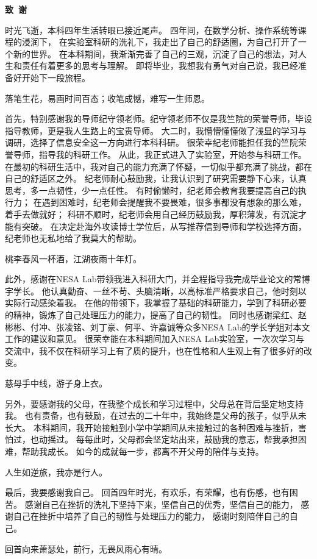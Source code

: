 \cleardoublepage{}
\begin{center}
    \bfseries {} 致~谢
\end{center}

时光飞逝，本科四年生活转眼已接近尾声。
四年间，在数学分析、操作系统等课程的浸润下，
在实验室科研的洗礼下，我走出了自己的舒适圈，为自己打开了一个新的世界。
在本科期间，我渐渐完善了自己的三观，沉淀了自己的想法，对人生和责任有着更多的思考与理解。
即将毕业，我想我有勇气对自己说，我已经准备好开始下一段旅程。

落笔生花，易画时间百态；收笔成憾，难写一生师恩。

首先，特别感谢我的导师纪守领老师。纪守领老师不仅是我竺院的荣誉导师，毕设指导教师，更是我人生路上的宝贵导师。
大二时，我懵懵懂懂做了浅显的学习与调研，选择了信息安全这一方向进行本科科研。
很荣幸纪老师能担任我的竺院荣誉导师，指导我的科研工作。
从此，我正式进入了实验室，开始参与科研工作。
在最初的科研生活中，我对自己的能力充满了怀疑，一切似乎都充满了挑战，都在自己的舒适区之外。
纪老师耐心鼓励我，让我认识到了研究需要静下心来，认真思考，多一点韧性，少一点任性。
有时偷懒时，纪老师会教育我要提高自己的执行力；
在遇到困难时，纪老师会提醒我不要畏难，很多事都没有想象的那么难，着手去做就好；
科研不顺时，纪老师会用自己经历鼓励我，厚积薄发，有沉淀才能有突破。
在决定赴海外攻读博士学位后，从写推荐信到导师和学校选择方面，纪老师也无私地给了我莫大的帮助。

桃李春风一杯酒，江湖夜雨十年灯。

此外，感谢在NESA Lab带领我进入科研大门，并全程指导我完成毕业论文的常博宇学长。
他认真勤奋、一丝不苟、头脑清晰，以高标准严格要求自己，他时刻以实际行动感染着我。
在他的带领下，我掌握了基础的科研能力，学到了科研必要的精神，锻炼了自己处理压力的能力，提高了自己的韧性。
同时也感谢梁红、赵彬彬、付冲、张凌铭、刘丁豪、何平、许嘉诚等众多NESA Lab的学长学姐对本文工作的建议和意见。
很荣幸能在本科期间加入NESA Lab实验室，一次次学习与交流中，我不仅在科研学习上有了质的提升，也在性格和人生观上有了很多好的改变。

慈母手中线，游子身上衣。

另外，要感谢我的父母，在我整个成长和学习过程中，父母总在背后坚定地支持我。
也有责备，也有鼓励，在过去的二十年中，我始终是父母的孩子，似乎从未长大。
本科期间，我开始接触到小学中学期间从未接触过的各种困难与挫折，害怕过，也动摇过。
每每此时，父母都会坚定站出来，鼓励我的意志，帮我承担困难，帮助我成长。
如今的成就每一步，都离不开父母的陪伴与支持。

人生如逆旅，我亦是行人。

最后，我要感谢我自己。
回首四年时光，有欢乐，有荣耀，也有伤感，也有困苦。
感谢自己在挫折的洗礼下坚持下来，坚信自己的优秀，坚信自己的能力，
感谢自己在挫折中培养了自己的韧性与处理压力的能力，
感谢时刻陪伴自己的自己。

回首向来萧瑟处，前行，无畏风雨心有晴。

